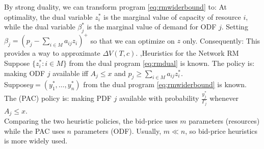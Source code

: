 \documentclass[12pt]{report}
\begin{document}
By strong duality, we can transform program \ref{eq:rmwiderbound} to:
At optimality, the dual variable $z_i^*$ is the marginal value of capacity of resource $i$,
while the dual variable $\beta_j^*$ is the marginal value of demand for ODF $j$. Setting $\beta_j=(p_j-\sum_{i\in M}a_{ij}z_i)^+$ so that
we can optimize on $z$ only. Consequently:
This provides a way to approximate $\Delta V(T,c)$.
\sep{Heuristics for the Network RM}
Suppose $\{z_i^*:i\in M\}$ from the dual program \ref{eq:rmdual} is known. The  policy is: making ODF $j$ available iff
$A_j\le x$ and $p_j \ge \sum_{i\in M}a_{ij}z_i^*$.\\
Suppose$y=(y_1^*,\ldots,y_n^*)$ from the dual program \ref{eq:rmwiderbound} is known. The  (PAC) policy is: making PDF $j$ available with
probability $\frac{y_j^*}{\Gamma_j}$ whenever $A_j\le x$.\\
Comparing the two heuristic policies, the bid-price uses $m$ parameters (resources) while the PAC uses $n$ parameters (ODF). Usually, $m\ll n$, so bid-price heuristics is more widely used.
\end{document}
